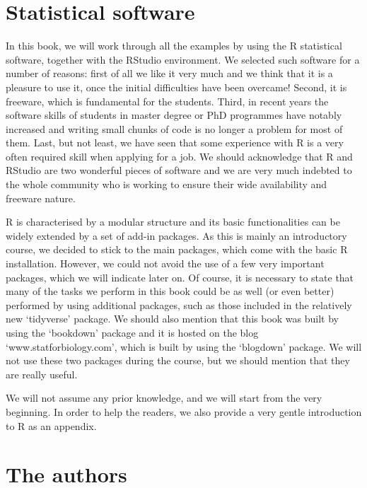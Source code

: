 \documentclass[a4paper,12pt,oneside]{book}
\begin{document}
\hypertarget{statistical-software}{%
\section*{Statistical software}\label{statistical-software}}

In this book, we will work through all the examples by using the R statistical software, together with the RStudio environment. We selected such software for a number of reasons: first of all we like it very much and we think that it is a pleasure to use it, once the initial difficulties have been overcame! Second, it is freeware, which is fundamental for the students. Third, in recent years the software skills of students in master degree or PhD programmes have notably increased and writing small chunks of code is no longer a problem for most of them. Last, but not least, we have seen that some experience with R is a very often required skill when applying for a job. We should acknowledge that R and RStudio are two wonderful pieces of software and we are very much indebted to the whole community who is working to ensure their wide availability and freeware nature.

R is characterised by a modular structure and its basic functionalities can be widely extended by a set of add-in packages. As this is mainly an introductory course, we decided to stick to the main packages, which come with the basic R installation. However, we could not avoid the use of a few very important packages, which we will indicate later on. Of course, it is necessary to state that many of the tasks we perform in this book could be as well (or even better) performed by using additional packages, such as those included in the relatively new `tidyverse' package. We should also mention that this book was built by using the `bookdown' package and it is hosted on the blog `www.statforbiology.com', which is built by using the `blogdown' package. We will not use these two packages during the course, but we should mention that they are really useful.

We will not assume any prior knowledge, and we will start from the very beginning. In order to help the readers, we also provide a very gentle introduction to R as an appendix.

\hypertarget{the-authors}{%
\section*{The authors}\label{the-authors}}
\end{document}
